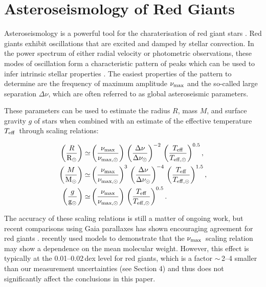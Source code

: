 \documentclass[modern]{aastex61}
\newcommand{\numax}{\mbox{$\nu_{\rm max}$}\xspace}
\newcommand{\Dnu}{\mbox{$\Delta \nu$}\xspace}
\newcommand{\teff}{\mbox{$T_{\rm eff}$}\xspace}
\begin{document}
\section{Asteroseismology of Red Giants}
Asteroseismology is a powerful tool for the charaterisation of red giant stars \citep[see][for detailed reviews]{2013ARA&A..51..353C, hekker17}.  Red giants exhibit oscillations that are excited and damped by stellar convection.  In the power spectrum of either radial velocity or photometric observations, these modes of oscillation form a characteristic pattern of peaks which can be used to infer intrinsic stellar properties \citep[e.g.,][]{2016AN....337..774D}.  The easiest properties of the pattern to determine are the frequency of maximum amplitude \numax and the so-called large separation \Dnu \citep{Kjeldsen95}, which are often referred to as global asteroseismic parameters.

These parameters can be used to estimate the radius $R$, mass $M$, and surface gravity $g$ of stars when combined with an estimate of the effective temperature \teff\ through scaling relations:

\begin{eqnarray}
\left( \frac{R}{\mathrm{R_{\odot}}} \right) \simeq & \left( \frac{\nu_{\rm max}}{\nu_{\rm max, \odot}} \right) \,
\left( \frac{\Delta \nu}{\Delta \nu_{\odot}} \right)^{-2} \, \left( \frac{T_{\rm eff}}{T_{\rm eff, \odot}} \right)^{0.5}, \\
\left( \frac{M}{\mathrm{M_{\odot}}} \right) \simeq & \left( \frac{\nu_{\rm max}}{\nu_{\rm max, \odot}} \right)^{3} \,
\left( \frac{\Delta \nu}{\Delta \nu_{\odot}} \right)^{-4} \, \left( \frac{T_{\rm eff}}{T_{\rm eff, \odot}} \right)^{1.5}, \\
\left( \frac{g}{\mathrm{g_{\odot}}} \right) \simeq & \left( \frac{\nu_{\rm max}}{\nu_{\rm max, \odot}} \right) \,
 \left( \frac{T_{\rm eff}}{T_{\rm eff, \odot}} \right)^{0.5}.
\end{eqnarray}

The accuracy of these scaling relations is still a matter of ongoing work, but recent comparisons using Gaia parallaxes has shown encouraging agreement for red giants \citep[e.g.,][]{2017ApJ...844..102H,zinn18}. \citet{viani17} recently used models to demonstrate that the \numax\ scaling relation may show a dependence on the mean molecular weight. However, this effect is typically at the 0.01--0.02\,dex level for red giants, which is a factor $\sim$\,2--4 smaller than our measurement uncertainties (see Section 4) and thus does not significantly affect the conclusions in this paper.
\end{document}
